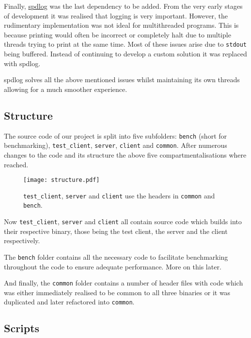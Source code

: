 \documentclass[article]{uom-coursework}
\begin{document}
Finally, \href{https://github.com/gabime/spdlog}{spdlog} was the
last dependency to be added. From the very early stages of
development it was realised that logging is very important.
However, the rudimentary implementation was not ideal for
multithreaded programs. This is because printing would often be
incorrect or completely halt due to multiple threads trying to
print at the same time. Most of these issues arise due to
\texttt{stdout} being buffered. Instead of continuing
to develop a custom solution it was replaced with spdlog.

spdlog solves all the above mentioned issues whilst maintaining
its own threads allowing for a much smoother experience.

\subsection{Structure}

The source code of our project is split into five subfolders:
\texttt{bench} (short for benchmarking), \texttt{test\_client},
\texttt{server}, \texttt{client} and \texttt{common}.
After numerous changes to the code and its structure the
above five compartmentalisations where reached.

\begin{figure}[H]
\centering
\begin{mdframed}[backgroundcolor=OffWhite]
\texttt{[image: structure.pdf]}
\end{mdframed}
\caption{\texttt{test\_client}, \texttt{server} and
\texttt{client} use the headers in \texttt{common} and
\texttt{bench}.}
\label{fig:folderdeps}
\end{figure}

Now \texttt{test\_client}, \texttt{server} and \texttt{client}
all contain source code which builds into their respective
binary, those being the test client, the server and the client
respectively.

The \texttt{bench} folder contains all the necessary code to
facilitate benchmarking throughout the code to ensure adequate
performance. More on this later.

And finally, the \texttt{common} folder contains a number of
header files with code which was either immediately realised to
be common to all three binaries or it was duplicated and later
refactored into \texttt{common}.

\subsection{Scripts}
\end{document}
